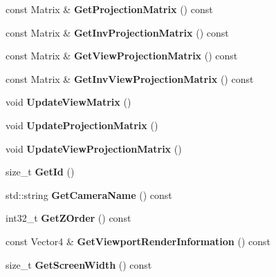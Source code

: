 \begin{DoxyCompactItemize}
const Matrix \& {\bfseries Get\+Projection\+Matrix} () const
\item 
\mbox{\label{classCamera_a8c4b6ade261f29d41517bd1674404ccc}} 
const Matrix \& {\bfseries Get\+Inv\+Projection\+Matrix} () const
\item 
\mbox{\label{classCamera_a2b52161705059c0f182d4d0b62808211}} 
const Matrix \& {\bfseries Get\+View\+Projection\+Matrix} () const
\item 
\mbox{\label{classCamera_a00cfc3d1d31e179df4d02b3878da75bd}} 
const Matrix \& {\bfseries Get\+Inv\+View\+Projection\+Matrix} () const
\item 
\mbox{\label{classCamera_a69369efae2a33da50510cc8c43c58bc5}} 
void {\bfseries Update\+View\+Matrix} ()
\item 
\mbox{\label{classCamera_a619c58dc226f1489502c9ed33ad87323}} 
void {\bfseries Update\+Projection\+Matrix} ()
\item 
\mbox{\label{classCamera_a44f25453a2a87f32d325f88bf3686add}} 
void {\bfseries Update\+View\+Projection\+Matrix} ()
\item 
\mbox{\label{classCamera_a863a3a0132d64395c04a418e0f6174a3}} 
size\+\_\+t {\bfseries Get\+Id} ()
\item 
\mbox{\label{classCamera_a1b4079998b211f9bed22323564e2f875}} 
std\+::string {\bfseries Get\+Camera\+Name} () const
\item 
\mbox{\label{classCamera_a6c981b26fc23315fcc7e6776d7dee4ae}} 
int32\+\_\+t {\bfseries Get\+Z\+Order} () const
\item 
\mbox{\label{classCamera_a055588d001b70381c0d5eaccdf9f7ece}} 
const Vector4 \& {\bfseries Get\+Viewport\+Render\+Information} () const
\item 
\mbox{\label{classCamera_aa2812325bada4a9c1955f005c125b313}} 
size\+\_\+t {\bfseries Get\+Screen\+Width} () const
\item 
\mbox{\label{classCamera_ad6bf28a11aa95a86497ad1e0d476d95b}} 

\end{DoxyCompactItemize}
